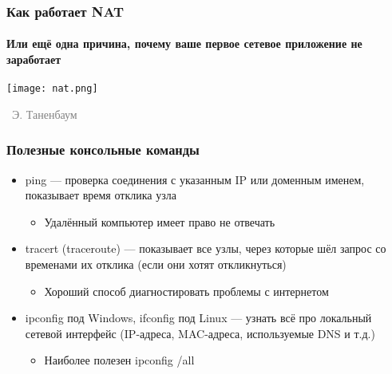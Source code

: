 \documentclass[xetex,mathserif,serif]{beamer}
\newcommand{\attribution}[1] {
\vspace{-5mm}\begin{flushright}\begin{scriptsize}\textcolor{gray}{\textcopyright\, #1}\end{scriptsize}\end{flushright}
}
\begin{document}
	\begin{frame}
		\frametitle{Как работает NAT}
		\framesubtitle{Или ещё одна причина, почему ваше первое сетевое приложение не заработает}
		\begin{center}
			\texttt{[image: nat.png]}
			\attribution{Э. Таненбаум}
		\end{center}
	\end{frame}

	\begin{frame}
		\frametitle{Полезные консольные команды}
		\begin{itemize}
			\item ping --- проверка соединения с указанным IP или доменным именем, показывает время отклика узла
			\begin{itemize}
				\item Удалённый компьютер имеет право не отвечать
			\end{itemize}
			\item tracert (traceroute) --- показывает все узлы, через которые шёл запрос со временами их отклика (если они хотят откликнуться)
			\begin{itemize}
				\item Хороший способ диагностировать проблемы с интернетом
			\end{itemize}
			\item ipconfig под Windows, ifconfig под Linux --- узнать всё про локальный сетевой интерфейс (IP-адреса, MAC-адреса, используемые DNS и т.д.)
			\begin{itemize}
				\item Наиболее полезен ipconfig /all
			\end{itemize}
		\end{itemize}
	\end{frame}
\end{document}
